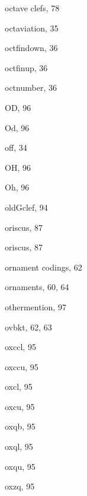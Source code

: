 \begin{theindex}
  \indexspace

  \item octave clefs, 78
  \item octaviation, 35
  \item {\Bslash octfindown}, 36
  \item {\Bslash octfinup}, 36
  \item {\Bslash octnumber}, 36
  \item {\Bslash OD}, 96
  \item {\Bslash Od}, 96
  \item {\Bslash off}, 34
  \item {\Bslash OH}, 96
  \item {\Bslash Oh}, 96
  \item {\Bslash oldGclef}, 94
  \item oriscus, 87
  \item {\Bslash oriscus}, 87
  \item ornament codings, 62
  \item ornaments, 60, 64
  \item {\Bslash othermention}, 97
  \item {\Bslash ovbkt}, 62, 63
  \item {\Bslash oxccl}, 95
  \item {\Bslash oxccu}, 95
  \item {\Bslash oxcl}, 95
  \item {\Bslash oxcu}, 95
  \item {\Bslash oxqb}, 95
  \item {\Bslash oxql}, 95
  \item {\Bslash oxqu}, 95
  \item {\Bslash oxzq}, 95

  \indexspace


\end{theindex}
